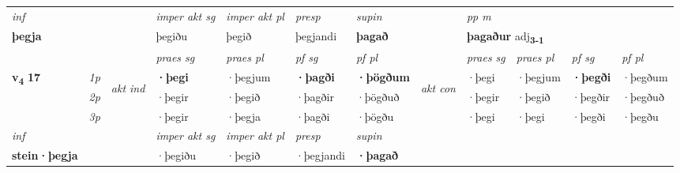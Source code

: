 \begin{longtable}[l]{X>{\footnotesize\itshape}llXXXXlXXXX}
   {\textit{inf}} & &  & \textit{imper akt sg} & \textit{imper akt pl}   & \textit{presp} & \textit{supin}  && \textit{pp m} \\*
  {\textbf{þegja}} & && þegiðu  & þegið   & þegjandi &  \textbf{þagað}  && \multicolumn{2}{l}{\textbf{þagaður} adj\textbf{\textsubscript{3-1}}} \\*

\midrule

 & &   & \textit{praes sg}  & \textit{praes pl}    & \textit{ pf sg} & \textit{pf pl} & & \textit{praes sg}  & \textit{praes pl}    & \textit{pf sg} & \textit{pf pl }  \\ \cmidrule{4-7} \cmidrule{9-12}
 \multirow{2}{*}{{{\textbf{v{\textsubscript{4}}} \Large{\textbf{17}}}}}  & 1p & \multirow{3}{*}{\begin{turn}{90}\textit{akt ind}\end{turn}} & \textbf{·þegi} & ·þegjum & \textbf{·þagði} & \textbf{·þögðum} & \multirow{3}{*}{\begin{turn}{90}\textit{akt con}\end{turn}} &·þegi & ·þegjum & \textbf{·þegði} & ·þegðum\\*
 & 2p &  &  ·þegir  & ·þegið & ·þagðir & ·þögðuð & & ·þegir & ·þegið & ·þegðir & ·þegðuð \\*
 & 3p &  & ·þegir & ·þegja & ·þagði & ·þögðu & & ·þegi & ·þegi& ·þegði & ·þegðu \\*
\cmidrule{4-7} \cmidrule{9-12}

   {\textit{inf}} & &  & \textit{imper akt sg} & \textit{imper akt pl}   & \textit{presp} & \textit{supin}   \\*
  {\textbf{stein\allowbreak ·þegja}} & && ·þegiðu  & ·þegið   & ·þegjandi &  \textbf{·þagað}   \\*

\midrule


\end{longtable}
